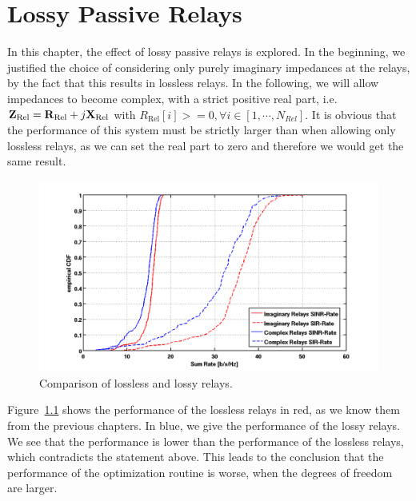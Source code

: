 \chapter{Lossy Passive Relays}
\label{sec:lossyrel}

In this chapter, the effect of lossy passive relays is explored.
In the beginning, we justified the choice of considering only purely imaginary impedances at the relays, by the fact that this results in lossless relays.
In the following, we will allow impedances to become complex, with a strict positive real part, i.e.
$\mathbf{Z}_\text{Rel} = \mathbf{R}_\text{Rel} + j\mathbf{X}_\text{Rel}$ with $R_\text{Rel}[i]>=0,\forall i\in[1,\cdots,N_{Rel}]$.
It is obvious that the performance of this system must be strictly larger than when allowing only lossless relays, as we can set the real part to zero and therefore we would get the same result.

\begin{figure}[h]
\centering
  \includegraphics[width=\linewidth]{images/Imagvscomp.png}
\caption{Comparison of lossless and lossy relays.}
\label{fig:lossyrel}
\end{figure}

Figure~\ref{fig:lossyrel} shows the performance of the lossless relays in red, as we know them from the previous chapters.
In blue, we give the performance of the lossy relays.
We see that the performance is lower than the performance of the lossless relays, which contradicts the statement above.
This leads to the conclusion that the performance of the optimization routine is worse, when the degrees of freedom are larger.


